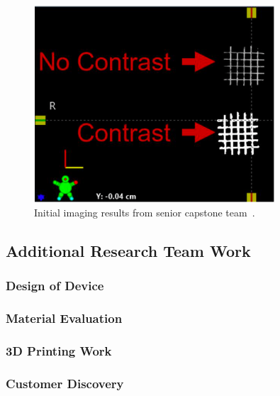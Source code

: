 \begin{figure}[h!]
        \centering
        \includegraphics[width=0.8\textwidth]{../figs/introduction/capstone_imaging_testing.png}
        \caption{Initial imaging results from senior capstone team~\cite{RefWorks:RefID:372-krakovskytumor}.}
        \label{fig:introduction:capstoneImagingTesting}
\end{figure}

\subsection{Additional Research Team Work\label{sec:introduction:priorWork:otherTeamWork}}

\subsubsection{Design of Device\label{sec:introduction:priorWork:otherTeamWork:deviceDesign}}

\subsubsection{Material Evaluation\label{sec:introduction:priorWork:otherTeamWork:materialEval}}

\subsubsection{3D Printing Work\label{sec:introduction:priorWork:otherTeamWork:3dPrinting}}

\subsubsection{Customer Discovery\label{sec:introduction:priorWork:otherTeamWork:customerDiscovery}}

